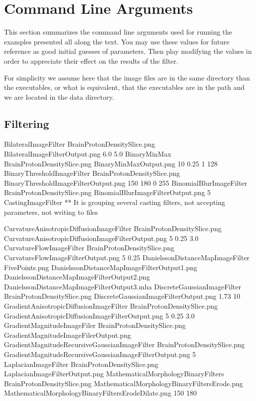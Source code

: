 \section{Command Line Arguments}

This section summarizes the command line arguments used for running the
examples presented all along the text. You may use these values for future
reference as good initial guesses of parameters. Then play modifying the values
in order to appreciate their effect on the results of the filter.

For simplicity we assume here that the image files are in the same directory
than the executables, or what is equivalent, that the executables are in the
path and we are located in the data directory.

\subsection{Filtering}

BilateralImageFilter             BrainProtonDensitySlice.png  BilateralImageFilterOutput.png        6.0    5.0
BinaryMinMax                     BrainProtonDensitySlice.png  BinaryMinMaxOutput.png                10      0.25  1  128
BinaryThresholdImageFilter       BrainProtonDensitySlice.png  BinaryThresholdImageFilterOutput.png  150 180 0 255
BinomialBlurImageFilter          BrainProtonDensitySlice.png  BinomialBlurImageFilterOutput.png     5
CastingImageFilter               ** It is grouping several casting filters, not accepting parameters, not writing to files

CurvatureAnisotropicDiffusionImageFilter  BrainProtonDensitySlice.png  CurvatureAnisotropicDiffusionImageFilterOutput.png  5  0.25  3.0
CurvatureFlowImageFilter         BrainProtonDensitySlice.png  CurvatureFlowImageFilterOutput.png   5  0.25
DanielssonDistanceMapImageFilter FivePoints.png DanielssonDistanceMapImageFilterOutput1.png DanielssonDistanceMapImageFilterOutput2.png DanielssonDistanceMapImageFilterOutput3.mha
DiscreteGaussianImageFilter      BrainProtonDensitySlice.png  DiscreteGaussianImageFilterOutput.png  1.73  10
GradientAnisotropicDiffusionImageFilter  BrainProtonDensitySlice.png GradientAnisotropicDiffusionImageFilterOutput.png   5    0.25   3.0
GradientMagnitudeImageFiler      BrainProtonDensitySlice.png  GradientMagnitudeImageFilerOutput.png
GradientMagnitudeRecursiveGaussianImageFilter  BrainProtonDensitySlice.png GradientMagnitudeRecursiveGaussianImageFilterOutput.png  5
LaplacianImageFilter             BrainProtonDensitySlice.png  LaplacianImageFilterOutput.png 
MathematicalMorphologyBinaryFilters BrainProtonDensitySlice.png MathematicalMorphologyBinaryFiltersErode.png MathematicalMorphologyBinaryFiltersErodeDilate.png 150 180


